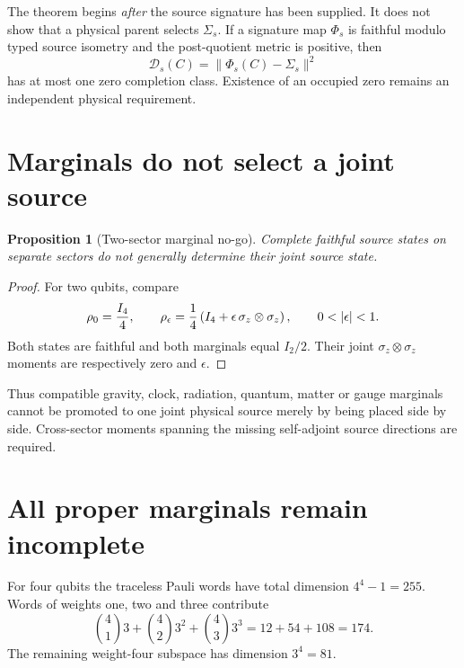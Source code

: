 \documentclass[11pt]{article}
\newtheorem{proposition}{Proposition}
\begin{document}
The theorem begins \emph{after} the source signature has been supplied.  It
does not show that a physical parent selects \(\Sigma_s\).  If a signature map
\(\Phi_s\) is faithful modulo typed source isometry and the post-quotient
metric is positive, then
\begin{equation}
 \mathcal D_s(C)=\lVert\Phi_s(C)-\Sigma_s\rVert^2
 \label{eq:signature-defect}
\end{equation}
has at most one zero completion class.  Existence of an occupied zero remains
an independent physical requirement.

\section{Marginals do not select a joint source}

\begin{proposition}[Two-sector marginal no-go]
Complete faithful source states on separate sectors do not generally determine
their joint source state.
\end{proposition}
\begin{proof}
For two qubits, compare
\begin{equation}
 \rho_0={I_4\over4},\qquad
 \rho_\epsilon={1\over4}
 \left(I_4+\epsilon\,\sigma_z\otimes\sigma_z\right),
 \qquad0<|\epsilon|<1.
 \label{eq:bipartite-countermodel}
\end{equation}
Both states are faithful and both marginals equal \(I_2/2\).  Their joint
\(\sigma_z\otimes\sigma_z\) moments are respectively zero and \(\epsilon\).
\end{proof}

Thus compatible gravity, clock, radiation, quantum, matter or gauge marginals
cannot be promoted to one joint physical source merely by being placed side by
side.  Cross-sector moments spanning the missing self-adjoint source
directions are required.

\section{All proper marginals remain incomplete}

For four qubits the traceless Pauli words have total dimension
\(4^4-1=255\).  Words of weights one, two and three contribute
\begin{equation}
 {4\choose1}3+{4\choose2}3^2+{4\choose3}3^3
 =12+54+108=174.
 \label{eq:proper-span}
\end{equation}
The remaining weight-four subspace has dimension \(3^4=81\).
\end{document}
